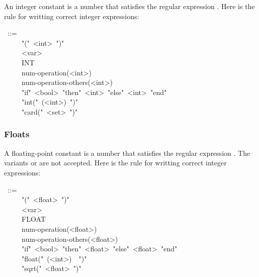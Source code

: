 {\noindent An integer constant  is a number that satisfies the regular expression
\mdcode{{}[0-9]+}. Here is the rule for writting correct integer expressions:%
\begin{mdpre}%
~::=\\
~~~~\textbar{}~"("~{\textless{}int\textgreater{}}~")"\\
~~~~\textbar{}~{\textless{}var\textgreater{}}\\
~~~~\textbar{}~INT\\
~~~~\textbar{}~num-operation({\textless{}int\textgreater{}})\\
~~~~\textbar{}~num-operation-others({\textless{}int\textgreater{}})\\
~~~~\textbar{}~"if"~{\textless{}bool\textgreater{}}~"then"~{\textless{}int\textgreater{}}~"else"~{\textless{}int\textgreater{}}~"end"\\
~~~~\textbar{}~"int("~({\textless{}int\textgreater{}})~")"\\
~~~~\textbar{}~"card("~{\textless{}set\textgreater{}}~")"%
\end{mdpre}
\subsubsection{Floats}\label{sec-floats}%

\noindent A floating-point constant  is a number that satisfies the regular
expression . The variants  or  are not accepted.
Here is the rule for writting correct integer expressions:%
\begin{mdpre}%
~::=\\
~~~~\textbar{}~"("~{\textless{}float\textgreater{}}~")"\\
~~~~\textbar{}~{\textless{}var\textgreater{}}\\
~~~~\textbar{}~FLOAT\\
~~~~\textbar{}~num-operation({\textless{}float\textgreater{}})\\
~~~~\textbar{}~num-operation-others({\textless{}float\textgreater{}})\\
~~~~\textbar{}~"if"~{\textless{}bool\textgreater{}}~"then"~{\textless{}float\textgreater{}}~"else"~{\textless{}float\textgreater{}}~"end"\\
~~~~\textbar{}~"float("~({\textless{}int\textgreater{}})~~")"\\
~~~~\textbar{}~"sqrt("~{\textless{}float\textgreater{}}~")"%
\end{mdpre}
}
